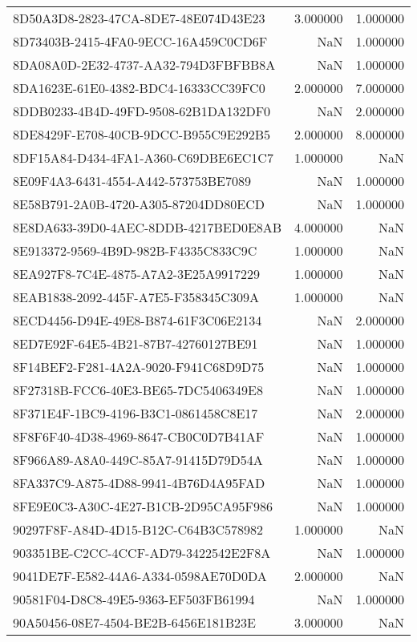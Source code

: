 \begin{tabular}{lrr}
8D50A3D8-2823-47CA-8DE7-48E074D43E23 & 3.000000 & 1.000000 \\
8D73403B-2415-4FA0-9ECC-16A459C0CD6F & NaN & 1.000000 \\
8DA08A0D-2E32-4737-AA32-794D3FBFBB8A & NaN & 1.000000 \\
8DA1623E-61E0-4382-BDC4-16333CC39FC0 & 2.000000 & 7.000000 \\
8DDB0233-4B4D-49FD-9508-62B1DA132DF0 & NaN & 2.000000 \\
8DE8429F-E708-40CB-9DCC-B955C9E292B5 & 2.000000 & 8.000000 \\
8DF15A84-D434-4FA1-A360-C69DBE6EC1C7 & 1.000000 & NaN \\
8E09F4A3-6431-4554-A442-573753BE7089 & NaN & 1.000000 \\
8E58B791-2A0B-4720-A305-87204DD80ECD & NaN & 1.000000 \\
8E8DA633-39D0-4AEC-8DDB-4217BED0E8AB & 4.000000 & NaN \\
8E913372-9569-4B9D-982B-F4335C833C9C & 1.000000 & NaN \\
8EA927F8-7C4E-4875-A7A2-3E25A9917229 & 1.000000 & NaN \\
8EAB1838-2092-445F-A7E5-F358345C309A & 1.000000 & NaN \\
8ECD4456-D94E-49E8-B874-61F3C06E2134 & NaN & 2.000000 \\
8ED7E92F-64E5-4B21-87B7-42760127BE91 & NaN & 1.000000 \\
8F14BEF2-F281-4A2A-9020-F941C68D9D75 & NaN & 1.000000 \\
8F27318B-FCC6-40E3-BE65-7DC5406349E8 & NaN & 1.000000 \\
8F371E4F-1BC9-4196-B3C1-0861458C8E17 & NaN & 2.000000 \\
8F8F6F40-4D38-4969-8647-CB0C0D7B41AF & NaN & 1.000000 \\
8F966A89-A8A0-449C-85A7-91415D79D54A & NaN & 1.000000 \\
8FA337C9-A875-4D88-9941-4B76D4A95FAD & NaN & 1.000000 \\
8FE9E0C3-A30C-4E27-B1CB-2D95CA95F986 & NaN & 1.000000 \\
90297F8F-A84D-4D15-B12C-C64B3C578982 & 1.000000 & NaN \\
903351BE-C2CC-4CCF-AD79-3422542E2F8A & NaN & 1.000000 \\
9041DE7F-E582-44A6-A334-0598AE70D0DA & 2.000000 & NaN \\
90581F04-D8C8-49E5-9363-EF503FB61994 & NaN & 1.000000 \\
90A50456-08E7-4504-BE2B-6456E181B23E & 3.000000 & NaN \\

\end{tabular}
